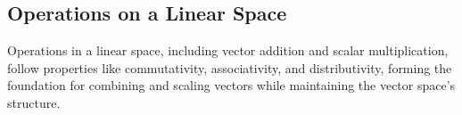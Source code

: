 \documentclass[12pt, reqno]{amsart}
\newtheorem{lemma}[theorem]{Lemma}
\theoremstyle{definition}
\newtheorem{definition}[theorem]{Definition}
\numberwithin{equation}{section}
\newcommand{\dF}{{\mathbb F}}
\begin{document}
\begin{comment}
The sum of two subsets in a vector space combines elements from both subsets. The following definition formalizes this concept.
\begin{definition}
    If $S_1, S_2$ are nonempty subsets of a vector space $V$, then the \textit{sum} of $S_1, S_2$ is defined as $S_1 + S_2 = \{x+y : x \in S_1, y \in S_2\}$
\end{definition}

The direct sum is a special way of combining subspaces, ensuring no overlap beyond the zero vector. The following definition explains when a vector space is the direct sum of two subspaces.
\begin{definition}
    A vector space $V$ is called the \textit{direct sum} of $W_1$ and $W_2$ if $W_1, W_2$ are subspaces of $V$ such that:
    \begin{itemize}
        \item {$W_1 \bigcap W_2 = \{0\}$}
        \item {$W_1 + W_2 = V$}
    \end{itemize}
    
    Denote: $V = W_1 \bigoplus W_2$
\end{definition}

The intersection of subspaces retains the structure of a vector space. The following lemma states this property.
\begin{lemma}
    The intersection of a collection of subspaces is also a vector space.
\end{lemma}

\begin{proof}
Let $W_i for I \in A$ be subspaces of V.

The intersection of $W_i$ is denoted as: $W = \bigcap_{i \in A} W_i$

We know that $0 \in W_i \forall i$. So, $0 \in W$.

Consider for any $a, b \in W$ and $\alpha \in \dF$. Then, $a,b \in W_i \forall i$.

But for every $i, W_i$ is a subspace of V, so we have:
$$T(\alpha a + b) = \alpha T(a) + T(b)$$

In other words, for any $a, b \in W_i \forall i$ and $\alpha \in \dF$, $T(\alpha a + b) = \alpha T(a) + T(b)$.

Hence, $W$ is a subspace of $V$.
\end{proof}
\end{comment}


\subsection{Operations on a Linear Space}
Operations in a linear space, including vector addition and scalar multiplication, follow properties like commutativity, associativity, and distributivity, forming the foundation for combining and scaling vectors while maintaining the vector space's structure.
\end{document}
